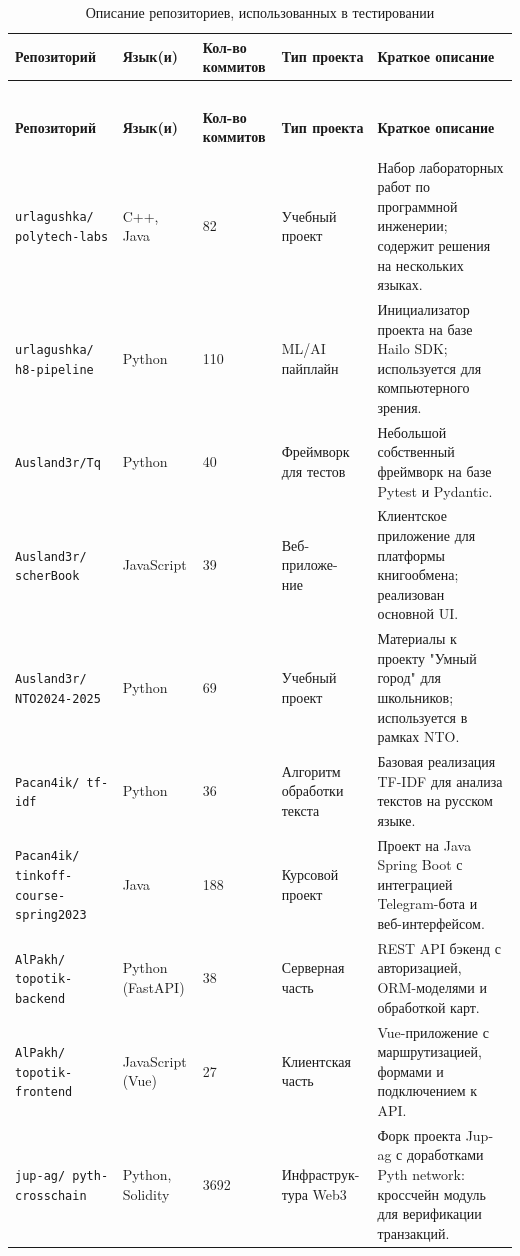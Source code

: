 \begin{longtable}{|p{3.5cm}|p{2.2cm}|p{2cm}|p{3cm}|p{4.5cm}|}
	\caption{Описание репозиториев, использованных в тестировании}
	\label{tab:test_repos} \\
	\hline
	\textbf{Репозиторий} & \textbf{Язык(и)} & \textbf{Кол-во коммитов} & \textbf{Тип проекта} & \textbf{Краткое описание} \\
	\hline
	\endfirsthead
	
	\multicolumn{5}{c}{{\tablename\ \thetable{}}} \\
	\hline
	\textbf{Репозиторий} & \textbf{Язык(и)} & \textbf{Кол-во коммитов} & \textbf{Тип проекта} & \textbf{Краткое описание} \\
	\hline
	\endhead
	
	\hline \multicolumn{5}{r}{{}} \\
	\endfoot
	
	\hline
	\endlastfoot
	
	\texttt{urlagushka/
		polytech-labs} & C++, Java & 82 & Учебный проект & Набор лабораторных работ по программной инженерии; содержит решения на нескольких языках. \\
	\hline
	\texttt{urlagushka/
		h8-pipeline} & Python & 110 & ML/AI пайплайн & Инициализатор проекта на базе Hailo SDK; используется для компьютерного зрения. \\
	\hline
	\texttt{Ausland3r/Tq} & Python & 40 & Фреймворк для тестов & Небольшой собственный фреймворк на базе Pytest и Pydantic. \\
	\hline
	\texttt{Ausland3r/
		scherBook} & JavaScript & 39 & Веб-приложе-
		ние & Клиентское приложение для платформы книгообмена; реализован основной UI. \\
	\hline
	\texttt{Ausland3r/
		NTO2024-2025} & Python & 69 & Учебный проект & Материалы к проекту "Умный город" для школьников; используется в рамках NTO. \\
	\hline
	\texttt{Pacan4ik/
		tf-idf} & Python & 36 & Алгоритм обработки текста & Базовая реализация TF-IDF для анализа текстов на русском языке. \\
	\hline
	\texttt{Pacan4ik/
		tinkoff-course-
		spring2023} & Java & 188 & Курсовой проект & Проект на Java Spring Boot с интеграцией Telegram-бота и веб-интерфейсом. \\
	\hline
	\texttt{AlPakh/
		topotik-
		backend} & Python (FastAPI) & 38 & Серверная часть & REST API бэкенд с авторизацией, ORM-моделями и обработкой карт. \\
	\hline
	\texttt{AlPakh/
		topotik-
		frontend} & JavaScript (Vue) & 27 & Клиентская часть & Vue-приложение с маршрутизацией, формами и подключением к API. \\
	\hline
	\texttt{jup-ag/
		pyth-
		crosschain} & Python, Solidity & 3692 & Инфраструк-
		тура Web3 & Форк проекта Jup-ag с доработками Pyth network: кроссчейн модуль для верификации транзакций. \\
	\hline
\end{longtable}


